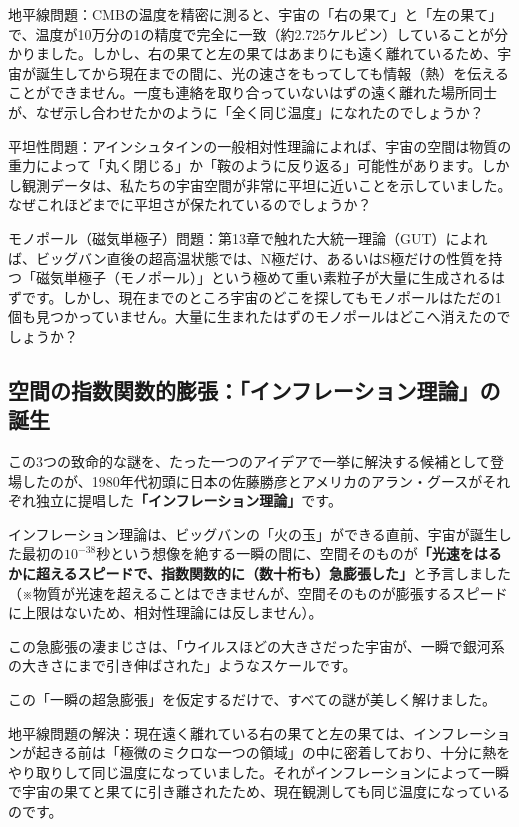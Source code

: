 地平線問題：CMBの温度を精密に測ると、宇宙の「右の果て」と「左の果て」で、温度が10万分の1の精度で完全に一致（約2.725ケルビン）していることが分かりました。しかし、右の果てと左の果てはあまりにも遠く離れているため、宇宙が誕生してから現在までの間に、光の速さをもってしても情報（熱）を伝えることができません。一度も連絡を取り合っていないはずの遠く離れた場所同士が、なぜ示し合わせたかのように「全く同じ温度」になれたのでしょうか？

平坦性問題：アインシュタインの一般相対性理論によれば、宇宙の空間は物質の重力によって「丸く閉じる」か「鞍のように反り返る」可能性があります。しかし観測データは、私たちの宇宙空間が非常に平坦に近いことを示していました。なぜこれほどまでに平坦さが保たれているのでしょうか？

モノポール（磁気単極子）問題：第13章で触れた大統一理論（GUT）によれば、ビッグバン直後の超高温状態では、N極だけ、あるいはS極だけの性質を持つ「磁気単極子（モノポール）」という極めて重い素粒子が大量に生成されるはずです。しかし、現在までのところ宇宙のどこを探してもモノポールはただの1個も見つかっていません。大量に生まれたはずのモノポールはどこへ消えたのでしょうか？

\subsection{空間の指数関数的膨張：「インフレーション理論」の誕生}

この3つの致命的な謎を、たった一つのアイデアで一挙に解決する候補として登場したのが、1980年代初頭に日本の佐藤勝彦とアメリカのアラン・グースがそれぞれ独立に提唱した\textbf{「インフレーション理論」}です。

インフレーション理論は、ビッグバンの「火の玉」ができる直前、宇宙が誕生した最初の\(10^{-38}\)秒という想像を絶する一瞬の間に、空間そのものが\textbf{「光速をはるかに超えるスピードで、指数関数的に（数十桁も）急膨張した」}と予言しました（※物質が光速を超えることはできませんが、空間そのものが膨張するスピードに上限はないため、相対性理論には反しません）。

この急膨張の凄まじさは、「ウイルスほどの大きさだった宇宙が、一瞬で銀河系の大きさにまで引き伸ばされた」ようなスケールです。

この「一瞬の超急膨張」を仮定するだけで、すべての謎が美しく解けました。

地平線問題の解決：現在遠く離れている右の果てと左の果ては、インフレーションが起きる前は「極微のミクロな一つの領域」の中に密着しており、十分に熱をやり取りして同じ温度になっていました。それがインフレーションによって一瞬で宇宙の果てと果てに引き離されたため、現在観測しても同じ温度になっているのです。

